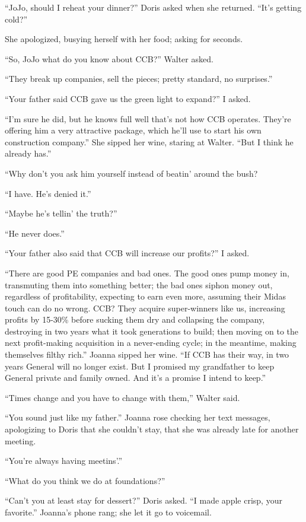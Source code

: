 ``JoJo, should I reheat your dinner?'' Doris asked when she returned.
``It's getting cold?''

She apologized, busying herself with her food; asking for seconds.

``So, JoJo what do you know about CCB?'' Walter asked.

``They break up companies, sell the pieces; pretty standard, no
surprises.''

``Your father said CCB gave us the green light to expand?'' I asked.

``I'm sure he did, but he knows full well that's not how CCB operates.
They're offering him a very attractive package, which he'll use to start
his own construction company.'' She sipped her wine, staring at Walter.
``But I think he already has.''

``Why don't you ask him yourself instead of beatin' around the bush?

``I have. He's denied it.''

``Maybe he's tellin' the truth?''

``He never does.''

``Your father also said that CCB will increase our profits?'' I asked.

``There are good PE companies and bad ones. The good ones pump money in,
transmuting them into something better; the bad ones siphon money out,
regardless of profitability, expecting to earn even more, assuming their
Midas touch can do no wrong. CCB? They acquire super-winners like us,
increasing profits by 15-30\% before sucking them dry and collapsing the
company, destroying in two years what it took generations to build; then
moving on to the next profit-making acquisition in a never-ending cycle;
in the meantime, making themselves filthy rich.'' Joanna sipped her
wine. ``If CCB has their way, in two years General will no longer exist.
But I promised my grandfather to keep General private and family owned.
And it's a promise I intend to keep.''

``Times change and you have to change with them,'' Walter said.

``You sound just like my father.'' Joanna rose checking her text
messages, apologizing to Doris that she couldn't stay, that she was
already late for another meeting.

``You're always having meetins'.''

``What do you think we do at foundations?''

``Can't you at least stay for dessert?'' Doris asked. ``I made apple
crisp, your favorite.'' Joanna's phone rang; she let it go to voicemail.

